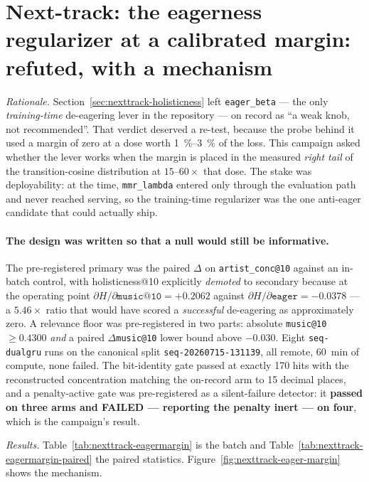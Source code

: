 \documentclass[11pt]{article}
\newcommand{\dsid}[1]{\texttt{\small #1}}
\begin{document}
\section{Next-track: the eagerness regularizer at a calibrated margin: refuted, with a mechanism}
\label{sec:nexttrack-eagermargin}
\emph{Rationale.} Section~\ref{sec:nexttrack-holisticness} left \texttt{eager\_beta} --- the
only \emph{training-time} de-eagering lever in the repository --- on record as ``a
weak knob, not recommended''. That verdict deserved a re-test, because the probe
behind it used a margin of zero at a dose worth \SIrange{1}{3}{\percent} of the
loss. This campaign asked whether the lever works when the margin is placed in the
measured \emph{right tail} of the transition-cosine distribution at
$\numrange{15}{60}\times$ that dose. The stake was deployability: at the time,
\texttt{mmr\_lambda} entered only through the evaluation path and never reached
serving, so the training-time regularizer was the one anti-eager candidate that
could actually ship.

\paragraph{The design was written so that a null would still be informative.} The
pre-registered primary was the paired $\Delta$ on \texttt{artist\_conc@10} against
an in-batch control, with holisticness@10 explicitly \emph{demoted} to secondary
because at the operating point $\partial H/\partial\texttt{music@10} =
+\num{0.2062}$ against $\partial H/\partial\texttt{eager} = -\num{0.0378}$ --- a
$\num{5.46}\times$ ratio that would have scored a \emph{successful} de-eagering as
approximately zero. A relevance floor was pre-registered in two parts: absolute
\texttt{music@10} $\ge\num{0.4300}$ \emph{and} a paired $\Delta$\texttt{music@10}
lower bound above $-\num{0.030}$. Eight \texttt{seq-dualgru} runs on the canonical
split \dsid{seq-20260715-131139}, all remote, \SI{60}{\minute} of compute, none
failed. The bit-identity gate passed at exactly \num{170} hits with the
reconstructed concentration matching the on-record arm to \num{15} decimal places,
and a penalty-active gate was pre-registered as a silent-failure detector: it
\textbf{passed on three arms and FAILED --- reporting the penalty inert --- on
four}, which is the campaign's result.

\emph{Results.} Table~\ref{tab:nexttrack-eagermargin} is the batch and
Table~\ref{tab:nexttrack-eagermargin-paired} the paired statistics.
Figure~\ref{fig:nexttrack-eager-margin} shows the mechanism.
\end{document}
